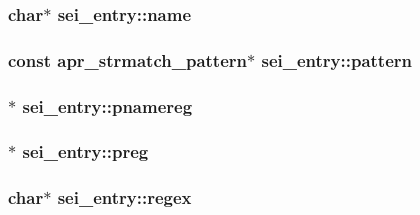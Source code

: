 \subsubsection[{\texorpdfstring{name}{name}}]{\setlength{\rightskip}{0pt plus 5cm}char$\ast$ sei\+\_\+entry\+::name}\hypertarget{structsei__entry_a94987315f5d913df9d6e25ba464c2be5}{}\label{structsei__entry_a94987315f5d913df9d6e25ba464c2be5}
\subsubsection[{\texorpdfstring{pattern}{pattern}}]{\setlength{\rightskip}{0pt plus 5cm}const {\bf apr\+\_\+strmatch\+\_\+pattern}$\ast$ sei\+\_\+entry\+::pattern}\hypertarget{structsei__entry_a39460ad568de81c9a36b0561306f06cf}{}\label{structsei__entry_a39460ad568de81c9a36b0561306f06cf}
\subsubsection[{\texorpdfstring{pnamereg}{pnamereg}}]{$\ast$ sei\+\_\+entry\+::pnamereg}\hypertarget{structsei__entry_afe620c6795ee0ec28eb89a2129564635}{}\label{structsei__entry_afe620c6795ee0ec28eb89a2129564635}
\subsubsection[{\texorpdfstring{preg}{preg}}]{$\ast$ sei\+\_\+entry\+::preg}\hypertarget{structsei__entry_ae35c7c482d8737e538512c13fe7d4035}{}\label{structsei__entry_ae35c7c482d8737e538512c13fe7d4035}
\subsubsection[{\texorpdfstring{regex}{regex}}]{\setlength{\rightskip}{0pt plus 5cm}char$\ast$ sei\+\_\+entry\+::regex}\hypertarget{structsei__entry_ab1daf02ba0579b14e49879942dbff21a}{}\label{structsei__entry_ab1daf02ba0579b14e49879942dbff21a}
